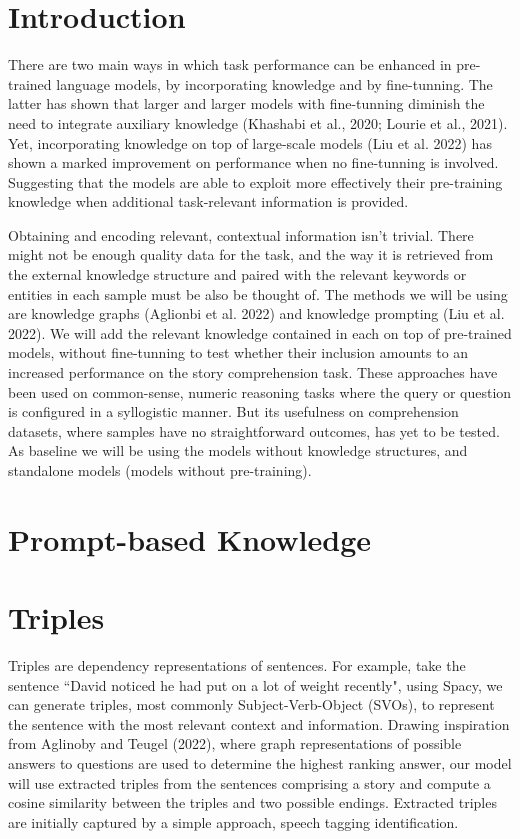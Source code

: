 \documentclass{article}
\begin{document}
\begin{multicols}{2}
\section{Introduction}
There are two main ways in which task performance can be enhanced in pre-trained language models, by incorporating knowledge and by fine-tunning. The latter has shown that larger and larger models with fine-tunning diminish the need to integrate auxiliary knowledge (Khashabi et al., 2020; Lourie et al., 2021). Yet, incorporating knowledge on top of large-scale models (Liu et al. 2022) has shown a marked improvement on performance when no fine-tunning is involved. Suggesting that the models are able to exploit more effectively their pre-training knowledge when additional task-relevant information is provided. 

Obtaining and encoding relevant, contextual information isn't trivial. There might not be enough quality data for the task, and the way it is retrieved from the external knowledge structure and paired with the relevant keywords or entities in each sample must be also be thought of. 
The methods we will be using are knowledge graphs (Aglionbi et al. 2022) and knowledge prompting (Liu et al. 2022). We will add the relevant knowledge contained in each on top of pre-trained models, without fine-tunning to test whether their inclusion amounts to an increased performance on the story comprehension task. These approaches have been used on common-sense, numeric reasoning tasks where the query or question is configured in a syllogistic manner. But its usefulness on comprehension datasets, where samples have no straightforward outcomes, has yet to be tested. As baseline we will be using the models without knowledge structures, and standalone models (models without pre-training). 

\section{Prompt-based Knowledge}
\lipsum[3-4]

\section{Triples}
Triples are dependency representations of sentences. For example, take the sentence “David noticed he had put on a lot of weight recently", using Spacy, we can generate triples, 
most commonly Subject-Verb-Object (SVOs), to represent the sentence with the most relevant context and information. Drawing inspiration from 
Aglinoby and Teugel (2022), where graph representations of possible answers to questions are used to determine the highest ranking answer, our model will use 
extracted triples from the sentences comprising a story and compute a cosine similarity between the triples and two possible endings. Extracted 
triples are initially captured by a simple approach, speech tagging identification.


\end{multicols}
\end{document}
